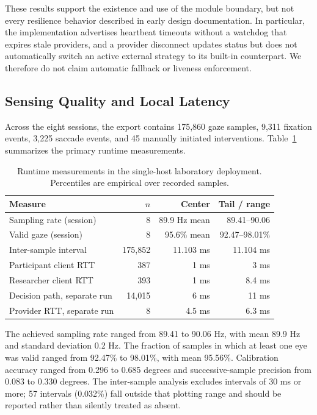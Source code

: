 \documentclass[sigconf,review,anonymous]{acmart}
\begin{document}
These results support the existence and use of the module boundary, but not every resilience behavior described in early design documentation.
In particular, the implementation advertises heartbeat timeouts without a watchdog that expires stale providers, and a provider disconnect updates status but does not automatically switch an active external strategy to its built-in counterpart.
We therefore do not claim automatic fallback or liveness enforcement.

\subsection{Sensing Quality and Local Latency}

Across the eight sessions, the export contains 175,860 gaze samples, 9,311 fixation events, 3,225 saccade events, and 45 manually initiated interventions.
Table~\ref{tab:runtime-results} summarizes the primary runtime measurements.

\begin{table}[t]
    \caption{Runtime measurements in the single-host laboratory deployment. Percentiles are empirical over recorded samples.}
    \label{tab:runtime-results}
    \small
    \begin{tabular}{lrrr}
        \toprule
        Measure & $n$ & Center & Tail / range \\
        \midrule
        Sampling rate (session) & 8 & 89.9 Hz mean & 89.41--90.06 \\
        Valid gaze (session) & 8 & 95.6\% mean & 92.47--98.01\% \\
        Inter-sample interval & 175,852 & 11.103 ms & 11.104 ms \\
        Participant client RTT & 387 & 1 ms & 3 ms \\
        Researcher client RTT & 393 & 1 ms & 8.4 ms \\
        Decision path, separate run & 14,015 & 6 ms & 11 ms \\
        Provider RTT, separate run & 8 & 4.5 ms & 6.3 ms \\
        \bottomrule
    \end{tabular}
\end{table}

The achieved sampling rate ranged from 89.41 to 90.06 Hz, with mean 89.9 Hz and standard deviation 0.2 Hz.
The fraction of samples in which at least one eye was valid ranged from 92.47\% to 98.01\%, with mean 95.56\%.
Calibration accuracy ranged from 0.296 to 0.685 degrees and successive-sample precision from 0.083 to 0.330 degrees.
The inter-sample analysis excludes intervals of 30 ms or more; 57 intervals (0.032\%) fall outside that plotting range and should be reported rather than silently treated as absent.
\end{document}
